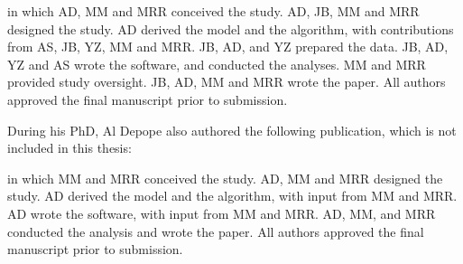 \documentclass[draft,final]{istaustriathesis}
\begin{document}
\begin{publicationlist}
\begin{itemize}
    \vspace{5pt}   
    
    in which AD, MM and MRR conceived the study. AD, JB, MM and MRR designed the study. AD derived the model and the algorithm, with contributions from AS, JB, YZ, MM and MRR. JB, AD, and YZ prepared the data. JB, AD, YZ and AS wrote the software, and conducted the analyses. MM and MRR provided study oversight. JB, AD, MM and MRR wrote the paper. All authors approved the final manuscript prior to submission.
\end{itemize}

During his PhD, Al Depope also authored the following publication, which is not included in this thesis: 

\vspace{5pt}
{}

    \vspace{5pt}    

    in which MM and MRR conceived the study. AD, MM and MRR designed the study. AD derived the model and the algorithm, with input  from MM and MRR. AD wrote the software, with input from MM and MRR. AD, MM, and MRR conducted the analysis and wrote the paper. All authors approved the final manuscript prior to submission. 

\end{publicationlist}
\end{document}
